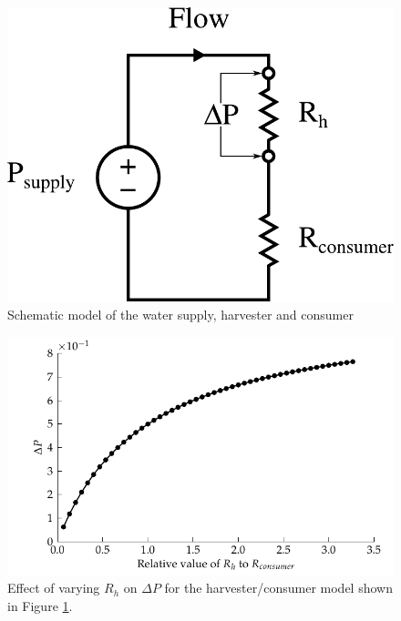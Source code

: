 \begin{figure} \begin{centering}
        \includegraphics[scale=0.55]{content/pt1/01-PowerHarvesting/graphics/Harvester_equivalentCircuit_output}
        \par\end{centering}

\protect\caption{\label{fig:Schematic-model-of-harvester}Schematic model of the
    water supply, harvester and consumer}


\end{figure}


\begin{figure} \begin{centering}
        \includegraphics{content/pt1/01-PowerHarvesting/graphics/streamingCell_consumerModel_dP}
        \par\end{centering}

\protect\caption{\label{fig:Effect-of-varying-Rh-onP}Effect of varying $R_{h}$
    on $\Delta P$ for the harvester/consumer model shown in Figure
    \ref{fig:Schematic-model-of-harvester}.}


\end{figure}


